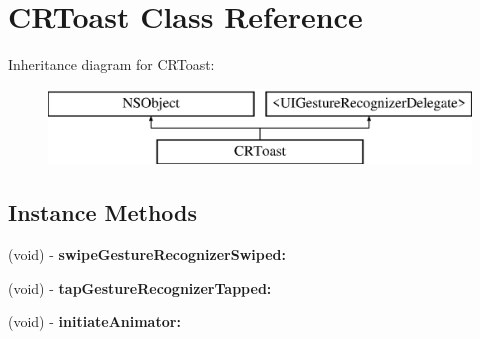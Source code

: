 \hypertarget{interface_c_r_toast}{}\section{C\+R\+Toast Class Reference}
\label{interface_c_r_toast}
Inheritance diagram for C\+R\+Toast\+:\begin{figure}[H]
\begin{center}
\leavevmode
\includegraphics[height=2.000000cm]{interface_c_r_toast}
\end{center}
\end{figure}
\subsection*{Instance Methods}
\begin{DoxyCompactItemize}
\item 
\hypertarget{interface_c_r_toast_ade91916cd0bf83e35e26040d020083be}{}(void) -\/ {\bfseries swipe\+Gesture\+Recognizer\+Swiped\+:}\label{interface_c_r_toast_ade91916cd0bf83e35e26040d020083be}

\item 
\hypertarget{interface_c_r_toast_ab3f8708be43755848f8e366abfaf1215}{}(void) -\/ {\bfseries tap\+Gesture\+Recognizer\+Tapped\+:}\label{interface_c_r_toast_ab3f8708be43755848f8e366abfaf1215}

\item 
\hypertarget{interface_c_r_toast_adcb70e87690baec085143985e78759de}{}(void) -\/ {\bfseries initiate\+Animator\+:}\label{interface_c_r_toast_adcb70e87690baec085143985e78759de}

\end{DoxyCompactItemize}
